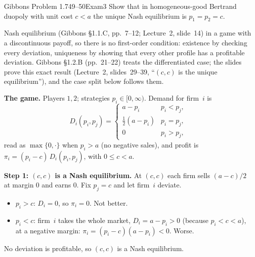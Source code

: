 \begin{exsol}{Gibbons Problem 1.7}{49--50}{Exam}{3}
\asked Show that in homogeneous-good Bertrand duopoly with unit cost $c < a$ the unique Nash
equilibrium is $p_1 = p_2 = c$.

\method Nash equilibrium (Gibbons \S1.1.C, pp.~7--12; Lecture~2, slide~14) in a game with a
discontinuous payoff, so there is no first-order condition: existence by checking every
deviation, uniqueness by showing that every other profile has a profitable deviation. Gibbons
\S1.2.B (pp.~21--22) treats the differentiated case; the slides prove this exact result (Lecture~2,
slides~29--39, ``$(c,c)$ is the unique equilibrium''), and the case split below follows them.

\solution
\textbf{The game.} Players $1, 2$; strategies $p_i \in [0, \infty)$. Demand for firm~$i$ is
\[
  D_i(p_i, p_j) = \begin{cases} a - p_i & p_i < p_j,\\ \tfrac12(a - p_i) & p_i = p_j,\\ 0 & p_i > p_j,\end{cases}
\]
read as $\max\{0, \cdot\}$ when $p_i > a$ (no negative sales), and profit is
$\pi_i = (p_i - c)\,D_i(p_i, p_j)$, with $0 \le c < a$.

\textbf{Step 1: $(c,c)$ is a Nash equilibrium.} At $(c,c)$ each firm sells $(a-c)/2$ at margin
$0$ and earns $0$. Fix $p_j = c$ and let firm~$i$ deviate.
\begin{itemize}
  \item $p_i > c$: $D_i = 0$, so $\pi_i = 0$. Not better.
  \item $p_i < c$: firm~$i$ takes the whole market, $D_i = a - p_i > 0$ (because $p_i < c < a$), at
  a negative margin: $\pi_i = (p_i - c)(a - p_i) < 0$. Worse.
\end{itemize}
No deviation is profitable, so $(c,c)$ is a Nash equilibrium.


\end{exsol}
